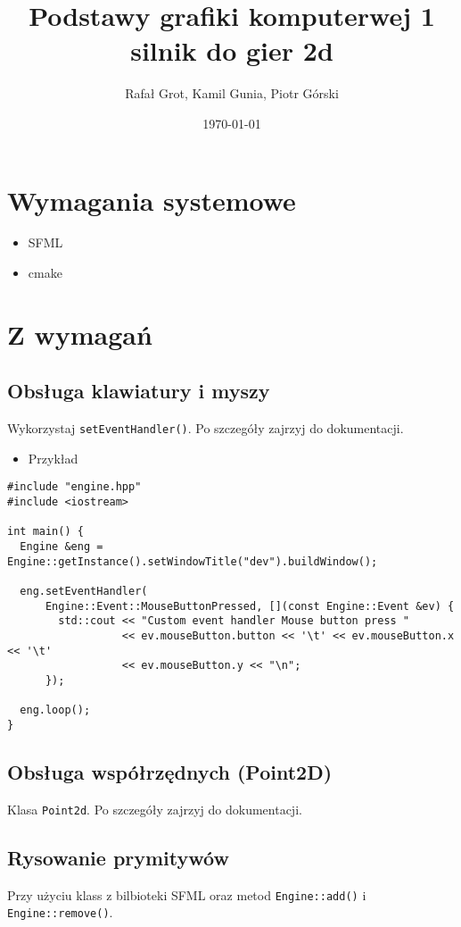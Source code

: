 \documentclass[11pt]{article}
\author{Rafał Grot, Kamil Gunia, Piotr Górski}
\date{\today}
\title{Podstawy grafiki komputerwej 1 silnik do gier 2d}
\begin{document}
\maketitle
\newpage
\section{Wymagania systemowe}
\label{sec:org8d8e0e6}
\begin{itemize}
\item SFML
\item cmake
\end{itemize}
\section{Z wymagań}
\label{sec:orged4aa2d}
\subsection{Obsługa klawiatury i myszy}
\label{sec:org33c34ec}
Wykorzystaj \texttt{setEventHandler()}. Po szczegóły zajrzyj do dokumentacji.

\begin{itemize}
\item Przykład
\end{itemize}
\begin{verbatim}
#include "engine.hpp"
#include <iostream>

int main() {
  Engine &eng = Engine::getInstance().setWindowTitle("dev").buildWindow();

  eng.setEventHandler(
      Engine::Event::MouseButtonPressed, [](const Engine::Event &ev) {
        std::cout << "Custom event handler Mouse button press "
                  << ev.mouseButton.button << '\t' << ev.mouseButton.x << '\t'
                  << ev.mouseButton.y << "\n";
      });

  eng.loop();
}
\end{verbatim}
\subsection{Obsługa współrzędnych (Point2D)}
\label{sec:org79b33ff}
Klasa \texttt{Point2d}. Po szczegóły zajrzyj do dokumentacji.
\subsection{Rysowanie prymitywów}
\label{sec:org7402ac5}
Przy użyciu klass z bilbioteki SFML oraz metod \texttt{Engine::add()} i \texttt{Engine::remove()}.
\end{document}
